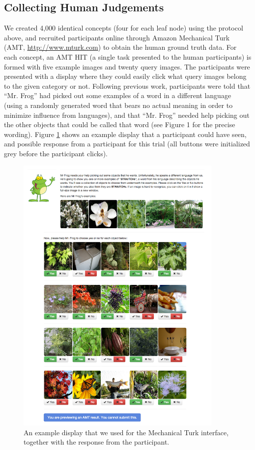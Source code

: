 \subsection{Collecting Human Judgements}

We created 4,000 identical concepts (four for each leaf node) using the protocol above, and recruited participants online through Amazon Mechanical Turk (AMT, \url{http://www.mturk.com}) to obtain the human ground truth data. For each concept, an AMT HIT (a single task presented to the human participants) is formed with five example images and twenty query images. The participants were presented with a display where they could easily click what query images belong to the given
category or not. Following previous work, participants were told that ``Mr. Frog'' had picked
out some examples of a word in a different language (using a randomly generated word that bears no actual meaning in order to minimize influence from languages), and that ``Mr. Frog'' needed help picking out the other objects that could be called that word (see Figure 1 for the precise wording). Figure \ref{fig:mrfrog} shows an example display that a participant could have seen, and possible response from a participant for this trial (all buttons were initialized grey before the participant clicks).

\begin{figure}
  \centering
  \includegraphics[width=0.9\textwidth]{figs/vcl/amt/amt_page_with_result.png}
  \caption{An example display that we used for the Mechanical Turk interface, together with the response from the participant.}\label{fig:mrfrog}
\end{figure}

